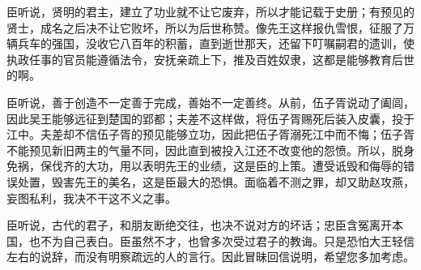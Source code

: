\documentclass[12pt,UTF-8,openany,a4]{ctexbook}
\begin{document}
\begin{large}
    臣听说，贤明的君主，建立了功业就不让它废弃，所以才能记载于史册；有预见的贤士，成名之后决不让它败坏，所以为后世称赞。像先王这样报仇雪恨，征服了万辆兵车的强国，没收它八百年的积蓄，直到逝世那天，还留下叮嘱嗣君的遗训，使执政任事的官员能遵循法令，安抚亲疏上下，推及百姓奴隶，这都是能够教育后世的啊。
    
    臣听说，善于创造不一定善于完成，善始不一定善终。从前，伍子胥说动了阖闾，因此吴王能够远征到楚国的郢都；夫差不这样做，将伍子胥赐死后装入皮囊，投于江中。夫差却不信伍子胥的预见能够立功，因此把伍子胥溺死江中而不悔；伍子胥不能预见新旧两主的气量不同，因此直到被投入江还不改变他的怨愤。所以，脱身免祸，保伐齐的大功，用以表明先王的业绩，这是臣的上策。遭受诋毁和侮辱的错误处置，毁害先王的美名，这是臣最大的恐惧。面临着不测之罪，却又助赵攻燕，妄图私利，我决不干这不义之事。
    
    臣听说，古代的君子，和朋友断绝交往，也决不说对方的坏话；忠臣含冤离开本国，也不为自己表白。臣虽然不才，也曾多次受过君子的教诲。只是恐怕大王轻信左右的说辞，而没有明察疏远的人的言行。因此冒昧回信说明，希望您多加考虑。
    
\end{large}
\end{document}
